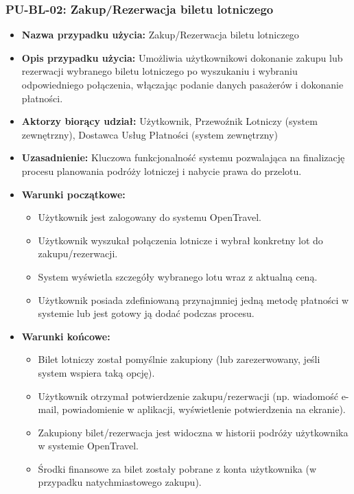 \documentclass[a4paper,12pt]{article}
\begin{document}
\subsubsection{PU-BL-02: Zakup/Rezerwacja biletu lotniczego}
\begin{itemize}
    \item \textbf{Nazwa przypadku użycia:} Zakup/Rezerwacja biletu lotniczego
    \item \textbf{Opis przypadku użycia:} Umożliwia użytkownikowi dokonanie zakupu lub rezerwacji wybranego biletu lotniczego po wyszukaniu i wybraniu odpowiedniego połączenia, włączając podanie danych pasażerów i dokonanie płatności.
    \item \textbf{Aktorzy biorący udział:} Użytkownik, Przewoźnik Lotniczy (system zewnętrzny), Dostawca Usług Płatności (system zewnętrzny)
    \item \textbf{Uzasadnienie:} Kluczowa funkcjonalność systemu pozwalająca na finalizację procesu planowania podróży lotniczej i nabycie prawa do przelotu.
    \item \textbf{Warunki początkowe:}
        \begin{itemize}
            \item Użytkownik jest zalogowany do systemu OpenTravel.
            \item Użytkownik wyszukał połączenia lotnicze i wybrał konkretny lot do zakupu/rezerwacji.
            \item System wyświetla szczegóły wybranego lotu wraz z aktualną ceną.
            \item Użytkownik posiada zdefiniowaną przynajmniej jedną metodę płatności w systemie lub jest gotowy ją dodać podczas procesu.
        \end{itemize}
    \item \textbf{Warunki końcowe:}
        \begin{itemize}
            \item Bilet lotniczy został pomyślnie zakupiony (lub zarezerwowany, jeśli system wspiera taką opcję).
            \item Użytkownik otrzymał potwierdzenie zakupu/rezerwacji (np. wiadomość e-mail, powiadomienie w aplikacji, wyświetlenie potwierdzenia na ekranie).
            \item Zakupiony bilet/rezerwacja jest widoczna w historii podróży użytkownika w systemie OpenTravel.
            \item Środki finansowe za bilet zostały pobrane z konta użytkownika (w przypadku natychmiastowego zakupu).

\end{itemize}
\end{itemize}
\end{document}
